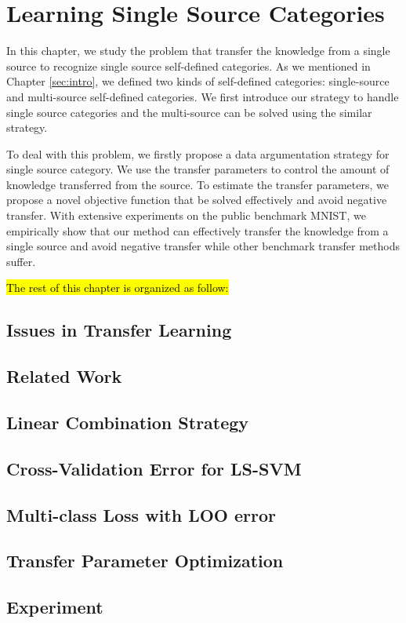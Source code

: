 \chapter{Learning Single Source Categories}
In this chapter, we study the problem that transfer the knowledge from a single source to recognize single source self-defined categories. As we mentioned in Chapter \ref{sec:intro}, we defined two kinds of self-defined categories: single-source and multi-source self-defined categories. We first introduce our strategy to handle single source categories and the multi-source can be solved using the similar strategy.

To deal with this problem, we firstly propose a data argumentation strategy for single source category. We use the transfer parameters to control the amount of knowledge transferred from the source. To estimate the transfer parameters, we propose a novel objective function that be solved effectively and avoid negative transfer. With extensive experiments on the public benchmark MNIST, we empirically show that our method can effectively transfer the knowledge from a single source and avoid negative transfer while other benchmark transfer methods suffer.

\hl{The rest of this chapter is organized as follow:}
\section{Issues in Transfer Learning} 

\section{Related Work}\label{sec:single:rl}

\section{Linear Combination Strategy}\label{sec:single:comb}

\section{Cross-Validation Error for LS-SVM}

\section{Multi-class Loss with LOO error}

\section{Transfer Parameter Optimization}

\section{Experiment}
